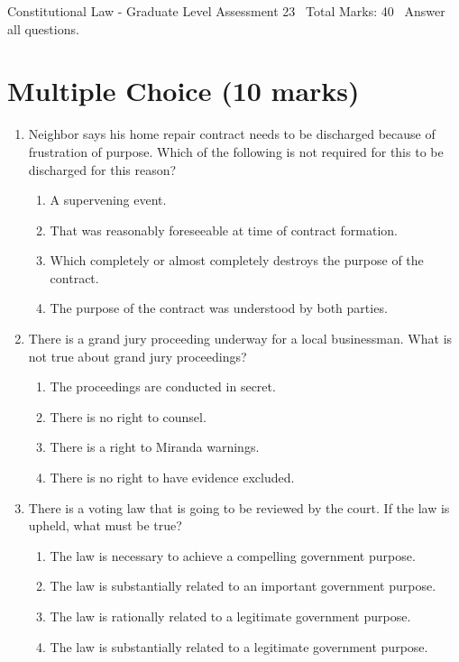 \documentclass[12pt]{article}
\begin{document}
\begin{center}
Constitutional Law - Graduate Level Assessment 23 \
Total Marks: 40 \
Answer all questions.
\end{center}

\section*{Multiple Choice (10 marks)}
\begin{enumerate}[label=\arabic*.]
\item Neighbor says his home repair contract needs to be discharged because of frustration of purpose. Which of the following is not required for this to be discharged for this reason?
\begin{enumerate}[label=(\alph*)]
    \item A supervening event.
    \item That was reasonably foreseeable at time of contract formation.
    \item Which completely or almost completely destroys the purpose of the contract.
    \item The purpose of the contract was understood by both parties.
\end{enumerate}
\item There is a grand jury proceeding underway for a local businessman. What is not true about grand jury proceedings?
\begin{enumerate}[label=(\alph*)]
    \item The proceedings are conducted in secret.
    \item There is no right to counsel.
    \item There is a right to Miranda warnings.
    \item There is no right to have evidence excluded.
\end{enumerate}
\item There is a voting law that is going to be reviewed by the court. If the law is upheld, what must be true?
\begin{enumerate}[label=(\alph*)]
    \item The law is necessary to achieve a compelling government purpose.
    \item The law is substantially related to an important government purpose.
    \item The law is rationally related to a legitimate government purpose.
    \item The law is substantially related to a legitimate government purpose.

\end{enumerate}
\end{enumerate}
\end{document}
